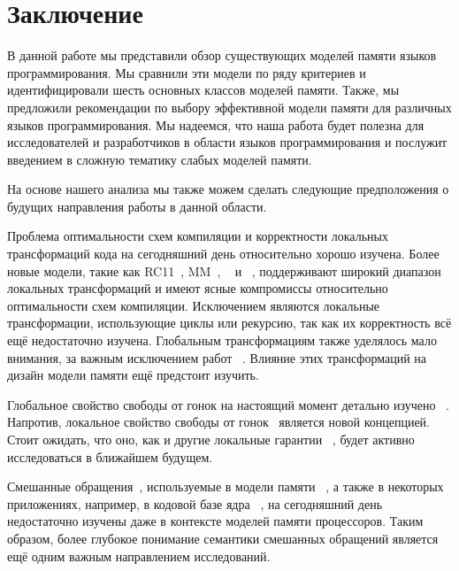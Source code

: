 \section{Заключение}
\label{sec:conclusion}

В данной работе мы представили обзор существующих моделей памяти языков программирования. 
Мы сравнили эти модели  по ряду критериев 
и идентифицировали шесть основных классов моделей памяти. 
Также, мы предложили рекомендации по выбору эффективной модели памяти 
для различных языков программирования. 
Мы надеемся, что наша работа будет полезна 
для исследователей и разработчиков в области языков программирования
и послужит введением в сложную тематику слабых моделей памяти. 


На основе нашего анализа мы также можем сделать следующие предположения 
о будущих направления работы в данной области. 

Проблема оптимальности схем компиляции и корректности локальных трансформаций кода 
на сегодняшний день относительно хорошо изучена.
Более новые модели, такие как 
RC11~\cite{Lahav-al:PLDI17}, \OCaml MM~\cite{Dolan-al:PLDI18},
\Promising~\cite{Kang-al:POPL17,Lee-al:PLDI20}
и \Weakestmo~\cite{Chakraborty-Vafeiadis:POPL19},
поддерживают широкий диапазон локальных трансформаций 
и имеют ясные компромиссы относительно оптимальности схем компиляции. 
Исключением являются  локальные трансформации, 
использующие  циклы или рекурсию, так как их корректность всё ещё недостаточно изучена. 
Глобальным трансформациям также уделялось мало внимания, за важным исключением работ~%
\cite{PichonPharabod-Sewell:POPL16, Lee-al:PLDI20}.
Влияние этих трансформаций на дизайн модели памяти 
ещё предстоит  изучить.

Глобальное свойство свободы от гонок на настоящий момент детально изучено~%
\cite{Manson-al:POPL05, Batty-al:ESOP15, Lahav-al:PLDI17, Kang-al:POPL17}. 
Напротив, локальное свойство свободы от гонок~\cite{Dolan-al:PLDI18}  
является новой концепцией. 
Стоит ожидать, что оно, как и другие локальные гарантии~%
\cite{Dodds-al:ESOP18, Jagadeesan-al:OOPSLA2020, Cho-al:PLDI21}, 
будет активно  исследоваться  в ближайшем будущем. 

Смешанные обращения~\cite{Flur-al:POPL17}, 
используемые в модели памяти \JS~\cite{Watt-al:PLDI2020}, 
а также в некоторых приложениях, например, в кодовой базе 
ядра \Linux~\cite{Flur-al:POPL17},
на сегодняшний день недостаточно изучены 
даже в контексте моделей памяти процессоров. 
Таким образом, более глубокое понимание семантики смешанных обращений 
является ещё одним важным направлением исследований. 

